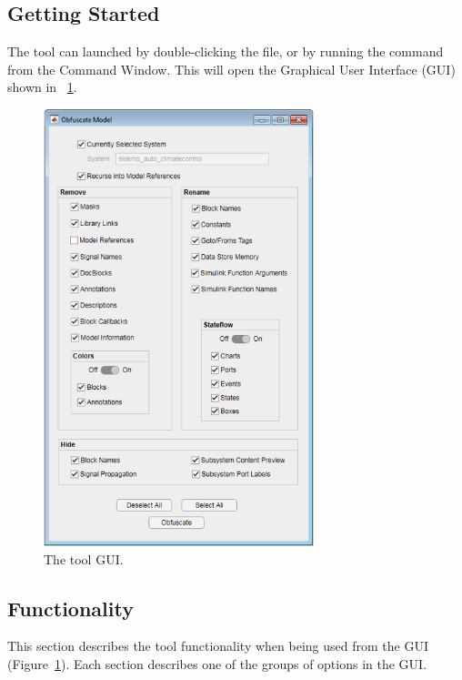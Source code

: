 \documentclass{article}
\begin{document}
\subsection{Getting Started}
The tool can launched by double-clicking the  file, or by running the command  from the Command Window. This will open the Graphical User Interface (GUI) shown in \figurename~\ref{FIG:contextMenu}.

\begin{figure}[htb!]
	\centering
	\includegraphics[width=0.7\textwidth]{../figs/GUI}
	\caption{The tool GUI.}
	\label{FIG:contextMenu}
\end{figure}

\newpage
\subsection{Functionality}
This section describes the tool functionality when being used from the GUI (Figure~\ref{FIG:contextMenu}). Each section describes one of the groups of options in the GUI.
\end{document}
